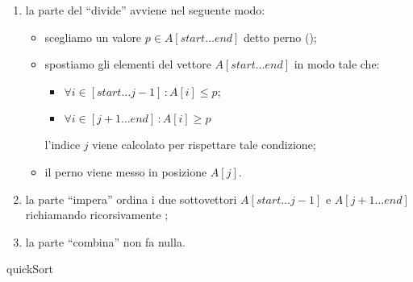\medskip
\begin{enumerate}
	\item la parte del \enquote{divide} avviene nel seguente modo:
	\begin{itemize}
		\item scegliamo un valore \(p \in A[start \dots end]\) detto perno ();
		\item spostiamo gli elementi del vettore \(A[start \dots end]\) in modo tale che:
		\begin{itemize}
			\item \(\forall i \in [start \dots j-1]\,:A[i] \leqslant p\);
			\item \(\forall i \in [j+1 \dots end]\,:A[i] \geqslant p\)
		\end{itemize}
		l'indice \(j\) viene calcolato per rispettare tale condizione;
		\item il perno viene messo in posizione \(A[j]\).
	\end{itemize}
	\item la parte \enquote{impera} ordina i due sottovettori \(A[start \dots j-1]\) e \(A[j+1 \dots end]\) richiamando ricorsivamente \quickSort;
	\item la parte \enquote{combina} non fa nulla.
\end{enumerate}

\begin{algorithm}[H]
\caption{quickSort}
	
	
\end{algorithm}


